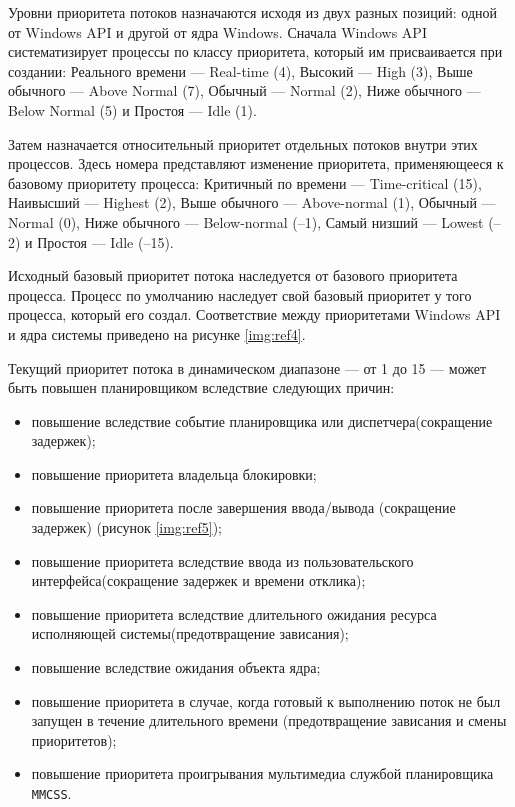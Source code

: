 Уровни приоритета потоков назначаются исходя из двух разных позиций:
одной от Windows API и другой от ядра Windows. 
Сначала Windows API систематизирует процессы по классу приоритета,
который им присваивается при создании: 
Реального времени — Real-time (4), Высокий — High (3),
Выше обычного — Above Normal (7), Обычный — Normal (2), Ниже обычного —
Below Normal (5) и Простоя — Idle (1).

Затем назначается относительный приоритет отдельных потоков внутри этих
процессов. Здесь номера представляют изменение приоритета, применяющееся
к базовому приоритету процесса: 
Критичный по времени — Time-critical (15),
Наивысший — Highest (2), Выше обычного — Above-normal (1), Обычный —
Normal (0), Ниже обычного — Below-normal (–1), Самый низший — Lowest (–2)
и Простоя — Idle (–15).

Исходный базовый приоритет потока наследуется от базового приоритета процесса. Процесс по умолчанию наследует свой базовый приоритет у
того процесса, который его создал.
Соответствие между приоритетами Windows API и ядра системы приведено
на рисунке \ref{img:ref4}.

\begin{figure}[ht!]
\end{figure}

Текущий приоритет потока в динамическом диапазоне --- от 1 до 15 --- может быть повышен планировщиком вследствие следующих причин:

\begin{itemize}
    \item повышение вследствие событие планировщика или диспетчера(сокращение
	задержек);
    \item повышение приоритета владельца блокировки;
    \item повышение приоритета после завершения ввода/вывода (сокращение задержек) (рисунок \ref{img:ref5});
    \item повышение приоритета вследствие ввода из пользовательского интерфейса(сокращение
	задержек и времени отклика);
    \item повышение приоритета вследствие длительного ожидания ресурса исполняющей системы(предотвращение зависания);
    \item повышение вследствие ожидания объекта ядра;
    \item повышение приоритета в случае, когда готовый к выполнению поток не был запущен в течение длительного времени (предотвращение зависания и смены приоритетов);
    \item повышение приоритета проигрывания мультимедиа службой планировщика \texttt{MMCSS}.
\end{itemize}

